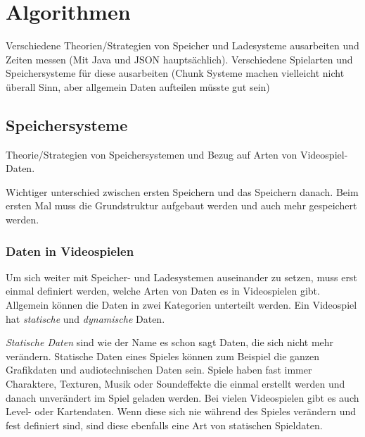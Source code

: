 \chapter{Algorithmen}\label{ch:algorithmen}
Verschiedene Theorien/Strategien von Speicher und Ladesysteme ausarbeiten und Zeiten messen (Mit Java und JSON hauptsächlich). Verschiedene Spielarten und Speichersysteme für diese ausarbeiten (Chunk Systeme machen vielleicht nicht überall Sinn, aber allgemein Daten aufteilen müsste gut sein)




\section{Speichersysteme}\label{sect:speichersysteme}
Theorie/Strategien von Speichersystemen und Bezug auf Arten von Videospiel-Daten.

Wichtiger unterschied zwischen ersten Speichern und das Speichern danach. Beim ersten Mal muss die Grundstruktur aufgebaut werden und auch mehr gespeichert werden.


\subsection{Daten in Videospielen}
Um sich weiter mit Speicher- und Ladesystemen auseinander zu setzen, muss erst einmal definiert werden, welche Arten von Daten es in Videospielen gibt. Allgemein können die Daten in zwei Kategorien unterteilt werden. Ein Videospiel hat \textit{statische} und \textit{dynamische} Daten.

\textit{Statische Daten} sind wie der Name es schon sagt Daten, die sich nicht mehr verändern. Statische Daten eines Spieles können zum Beispiel die ganzen Grafikdaten und audiotechnischen Daten sein. Spiele haben fast immer Charaktere, Texturen, Musik oder Soundeffekte die einmal erstellt werden und danach unverändert im Spiel geladen werden. Bei vielen Videospielen gibt es auch Level- oder Kartendaten. Wenn diese sich nie während des Spieles verändern und fest definiert sind, sind diese ebenfalls eine Art von statischen Spieldaten. 


